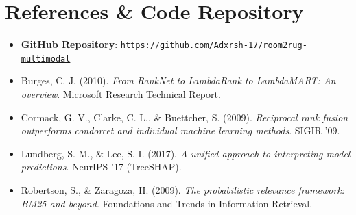 \documentclass[11pt,a4paper]{article}
\begin{document}
\section*{References \& Code Repository}
\begin{itemize}[leftmargin=*]
    \item \textbf{GitHub Repository}: \href{https://github.com/Adxrsh-17/room2rug-multimodal}{\texttt{https://github.com/Adxrsh-17/room2rug-multimodal}}
    \item Burges, C. J. (2010). \textit{From RankNet to LambdaRank to LambdaMART: An overview}. Microsoft Research Technical Report.
    \item Cormack, G. V., Clarke, C. L., \& Buettcher, S. (2009). \textit{Reciprocal rank fusion outperforms condorcet and individual machine learning methods}. SIGIR '09.
    \item Lundberg, S. M., \& Lee, S. I. (2017). \textit{A unified approach to interpreting model predictions}. NeurIPS '17 (TreeSHAP).
    \item Robertson, S., \& Zaragoza, H. (2009). \textit{The probabilistic relevance framework: BM25 and beyond}. Foundations and Trends in Information Retrieval.
\end{itemize}
\end{document}
